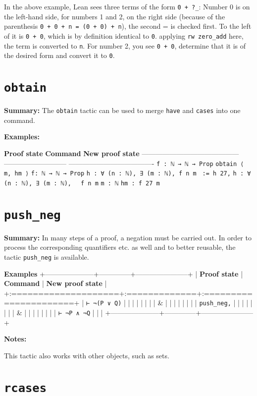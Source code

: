 \documentclass{memoir}
\begin{document}
In the above example, Lean sees three terms of the form \Verb|0 + ?_|: Number 0 is on the left-hand side, for numbers 1 and 2, on the right side (because of the parenthesis \Verb|0 + 0 + n = (0 + 0) + n|),  the second = is checked first. To the left of it is \Verb|0 + 0|, which is by definition identical to \Verb|0|. applying \Verb|rw zero_add| here, the term is converted to \Verb|n|. For number 2, you see \Verb|0 + 0|, determine that it is of the desired form and convert it to \Verb|0|.




\section{\Verb|obtain|}

\textbf{Summary:} The \Verb|obtain| tactic can be used to merge \Verb|have| and \Verb|cases| into one command.

\textbf{Examples:}

\textbf{Proof state} \textbf{Command} \textbf{New proof state}
------------------------------------------ --------------------------- -------------------------------------
\Verb|f : ℕ → ℕ → Prop| \Verb|obtain ⟨ m, hm ⟩| \Verb|f: ℕ → ℕ → Prop|
\Verb|h : ∀ (n : ℕ), ∃ (m : ℕ), f n m| \Verb| := h 27,| \Verb|h : ∀ (n : ℕ), ∃ (m : ℕ), |
\Verb| f n m|
\Verb|m : ℕ|
\Verb|hm : f 27 m|




\section{\Verb|push_neg|}

\textbf{Summary:} In many steps of a proof, a negation must be carried out. In order to process the corresponding quantifiers etc. as well and to better reusable, the tactic \Verb|push_neg| is available.

\textbf{Examples}
+---------------------+--------------+-----------------------+
| \textbf{Proof state} | \textbf{Command} | \textbf{New proof state} |
+:====================+:=============+:======================+
| \Verb|⊢ ¬(P ∨ Q)| | | |
| | | |
| & | | |
| | | |
| \Verb|push_neg,| | | |
| | | |
| & | | |
| | | |
| \Verb|⊢ ¬P ∧ ¬Q| | | |
+---------------------+--------------+-----------------------+

\textbf{Notes:}

This tactic also works with other objects, such as sets.




\section{\Verb|rcases|}
\end{document}
